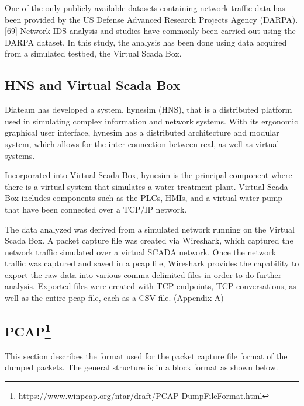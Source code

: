 \documentclass[12pt,]{article}
\let\rmarkdownfootnote\footnote%
\def\footnote{\protect\rmarkdownfootnote}
\begin{document}
One of the only publicly available datasets containing network traffic
data has been provided by the US Defense Advanced Research Projects
Agency (DARPA).{[}69{]} Network IDS analysis and studies have commonly
been carried out using the DARPA dataset. In this study, the analysis
has been done using data acquired from a simulated testbed, the Virtual
Scada Box.

\subsection{HNS and Virtual Scada Box}\label{hns-and-virtual-scada-box}

Diateam has developed a system, hynesim (HNS), that is a distributed
platform used in simulating complex information and network systems.
With its ergonomic graphical user interface, hynesim has a distributed
architecture and modular system, which allows for the inter-connection
between real, as well as virtual systems.

Incorporated into Virtual Scada Box, hynesim is the principal component
where there is a virtual system that simulates a water treatment plant.
Virtual Scada Box includes components such as the PLCs, HMIs, and a
virtual water pump that have been connected over a TCP/IP network.

The data analyzed was derived from a simulated network running on the
Virtual Scada Box. A packet capture file was created via Wireshark,
which captured the network traffic simulated over a virtual SCADA
network. Once the network traffic was captured and saved in a pcap file,
Wireshark provides the capability to export the raw data into various
comma delimited files in order to do further analysis. Exported files
were created with TCP endpoints, TCP conversations, as well as the
entire pcap file, each as a CSV file. (Appendix A)

\subsection[PCAP]{PCAP\footnote{\url{https://www.winpcap.org/ntar/draft/PCAP-DumpFileFormat.html}}}\label{pcap8}

This section describes the format used for the packet capture file
format of the dumped packets. The general structure is in a block format
as shown below.

\pagebreak
\end{document}
